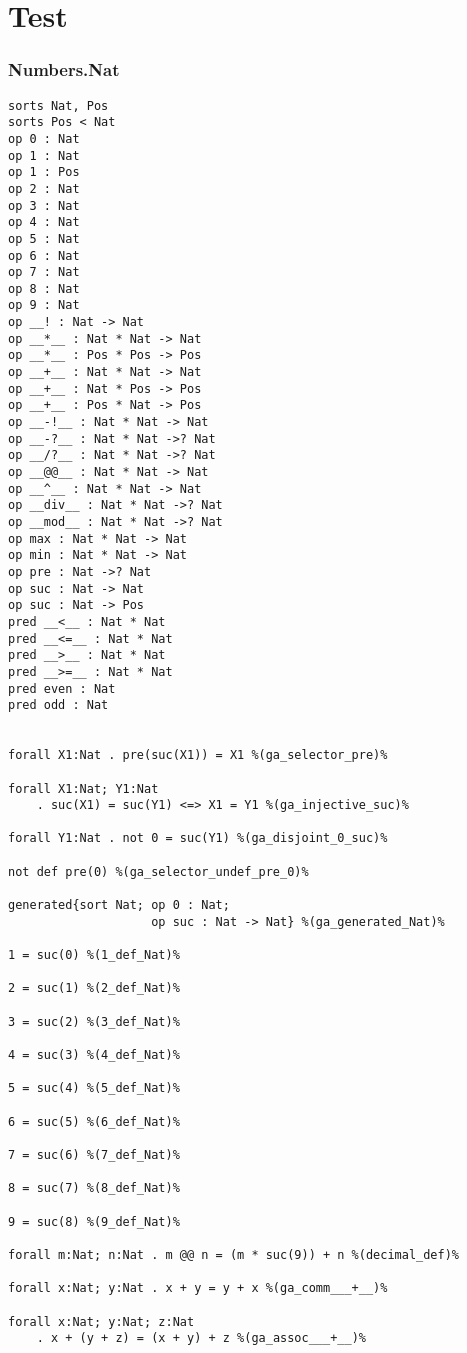 \documentclass[11pt,a4paper]{article}
\begin{document}
\part*{Test}
\section*{Numbers.Nat}
\begin{verbatim}
sorts Nat, Pos
sorts Pos < Nat
op 0 : Nat
op 1 : Nat
op 1 : Pos
op 2 : Nat
op 3 : Nat
op 4 : Nat
op 5 : Nat
op 6 : Nat
op 7 : Nat
op 8 : Nat
op 9 : Nat
op __! : Nat -> Nat
op __*__ : Nat * Nat -> Nat
op __*__ : Pos * Pos -> Pos
op __+__ : Nat * Nat -> Nat
op __+__ : Nat * Pos -> Pos
op __+__ : Pos * Nat -> Pos
op __-!__ : Nat * Nat -> Nat
op __-?__ : Nat * Nat ->? Nat
op __/?__ : Nat * Nat ->? Nat
op __@@__ : Nat * Nat -> Nat
op __^__ : Nat * Nat -> Nat
op __div__ : Nat * Nat ->? Nat
op __mod__ : Nat * Nat ->? Nat
op max : Nat * Nat -> Nat
op min : Nat * Nat -> Nat
op pre : Nat ->? Nat
op suc : Nat -> Nat
op suc : Nat -> Pos
pred __<__ : Nat * Nat
pred __<=__ : Nat * Nat
pred __>__ : Nat * Nat
pred __>=__ : Nat * Nat
pred even : Nat
pred odd : Nat


forall X1:Nat . pre(suc(X1)) = X1 %(ga_selector_pre)%

forall X1:Nat; Y1:Nat
    . suc(X1) = suc(Y1) <=> X1 = Y1 %(ga_injective_suc)%

forall Y1:Nat . not 0 = suc(Y1) %(ga_disjoint_0_suc)%

not def pre(0) %(ga_selector_undef_pre_0)%

generated{sort Nat; op 0 : Nat;
                    op suc : Nat -> Nat} %(ga_generated_Nat)%

1 = suc(0) %(1_def_Nat)%

2 = suc(1) %(2_def_Nat)%

3 = suc(2) %(3_def_Nat)%

4 = suc(3) %(4_def_Nat)%

5 = suc(4) %(5_def_Nat)%

6 = suc(5) %(6_def_Nat)%

7 = suc(6) %(7_def_Nat)%

8 = suc(7) %(8_def_Nat)%

9 = suc(8) %(9_def_Nat)%

forall m:Nat; n:Nat . m @@ n = (m * suc(9)) + n %(decimal_def)%

forall x:Nat; y:Nat . x + y = y + x %(ga_comm___+__)%

forall x:Nat; y:Nat; z:Nat
    . x + (y + z) = (x + y) + z %(ga_assoc___+__)%


\end{verbatim}
\end{document}

